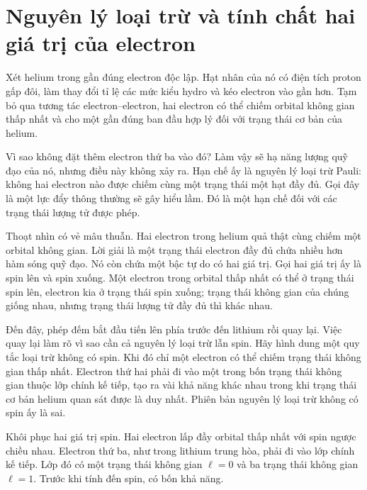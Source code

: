 \section{Nguyên lý loại trừ và tính chất hai giá trị của electron}

Xét helium trong gần đúng electron độc lập. Hạt nhân của nó có điện tích proton gấp đôi, làm thay đổi tỉ lệ các mức kiểu hydro và kéo electron vào gần hơn. Tạm bỏ qua tương tác electron--electron, hai electron có thể chiếm orbital không gian thấp nhất và cho một gần đúng ban đầu hợp lý đối với trạng thái cơ bản của helium.

Vì sao không đặt thêm electron thứ ba vào đó? Làm vậy sẽ hạ năng lượng quỹ đạo của nó, nhưng điều này không xảy ra. Hạn chế ấy là nguyên lý loại trừ Pauli: không hai electron nào được chiếm cùng một trạng thái một hạt đầy đủ. Gọi đây là một lực đẩy thông thường sẽ gây hiểu lầm. Đó là một hạn chế đối với các trạng thái lượng tử được phép.

Thoạt nhìn có vẻ mâu thuẫn. Hai electron trong helium quả thật cùng chiếm một orbital không gian. Lời giải là một trạng thái electron đầy đủ chứa nhiều hơn hàm sóng quỹ đạo. Nó còn chứa một bậc tự do có hai giá trị. Gọi hai giá trị ấy là spin lên và spin xuống. Một electron trong orbital thấp nhất có thể ở trạng thái spin lên, electron kia ở trạng thái spin xuống; trạng thái không gian của chúng giống nhau, nhưng trạng thái lượng tử đầy đủ thì khác nhau.

Đến đây, phép đếm bắt đầu tiến lên phía trước đến lithium rồi quay lại. Việc quay lại làm rõ vì sao cần cả nguyên lý loại trừ lẫn spin. Hãy hình dung một quy tắc loại trừ không có spin. Khi đó chỉ một electron có thể chiếm trạng thái không gian thấp nhất. Electron thứ hai phải đi vào một trong bốn trạng thái không gian thuộc lớp chính kế tiếp, tạo ra vài khả năng khác nhau trong khi trạng thái cơ bản helium quan sát được là duy nhất. Phiên bản nguyên lý loại trừ không có spin ấy là sai.

Khôi phục hai giá trị spin. Hai electron lấp đầy orbital thấp nhất với spin ngược chiều nhau. Electron thứ ba, như trong lithium trung hòa, phải đi vào lớp chính kế tiếp. Lớp đó có một trạng thái không gian \(\ell=0\) và ba trạng thái không gian \(\ell=1\). Trước khi tính đến spin, có bốn khả năng.

\begin{classroomqa}
\end{classroomqa}

